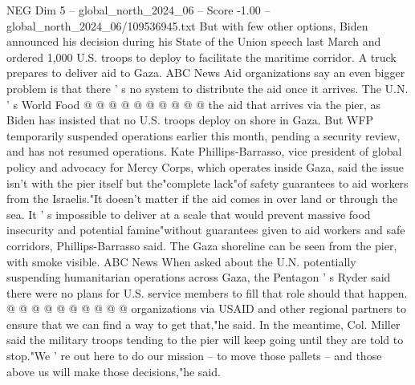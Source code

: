 \begin{textsample}{NEG Dim 5 – global\_north\_2024\_06 – Score -1.00 – global\_north\_2024\_06/109536945.txt}
But with few other options, Biden announced his decision during his State of the Union speech last March and ordered 1,000 U.S. troops to deploy to facilitate the maritime corridor.
A truck prepares to deliver aid to Gaza.
ABC News Aid organizations say an even bigger problem is that there ' s no system to distribute the aid once it arrives.
The U.N. ' s World Food @ @ @ @ @ @ @ @ @ @ the aid that arrives via the pier, as Biden has insisted that no U.S. troops deploy on shore in Gaza.
But WFP temporarily suspended operations earlier this month, pending a security review, and has not resumed operations.
Kate Phillips-Barrasso, vice president of global policy and advocacy for Mercy Corps, which operates inside Gaza, said the issue isn't with the pier itself but the"complete lack"of safety guarantees to aid workers from the Israelis."It doesn't matter if the aid comes in over land or through the sea.
It ' s impossible to deliver at a scale that would prevent massive food insecurity and potential famine"without guarantees given to aid workers and safe corridors, Phillips-Barrasso said.
The Gaza shoreline can be seen from the pier, with smoke visible.
ABC News When asked about the U.N. potentially suspending humanitarian operations across Gaza, the Pentagon ' s Ryder said there were no plans for U.S. service members to fill that role should that happen. @ @ @ @ @ @ @ @ @ @ organizations via USAID and other regional partners to ensure that we can find a way to get that,"he said.
In the meantime, Col.
Miller said the military troops tending to the pier will keep going until they are told to stop."We ' re out here to do our mission -- to move those pallets -- and those above us will make those decisions,"he said.

\end{textsample}
